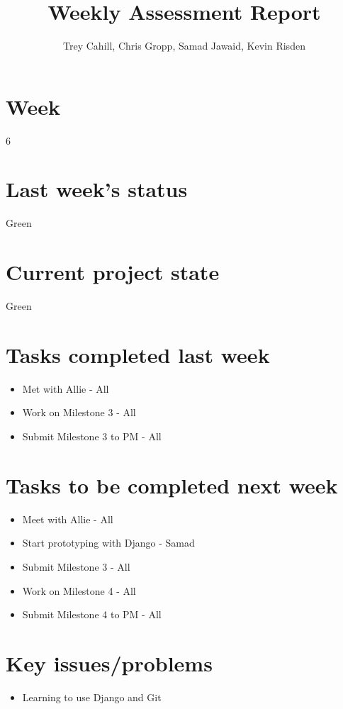 \documentclass{article}
\title{Weekly Assessment Report}
\author{Trey Cahill, Chris Gropp, Samad Jawaid, Kevin Risden}
\begin{document}
\maketitle
\section{Week}
6
\section{Last week's status}
Green
\section{Current project state}
Green
\section{Tasks completed last week}
\begin{itemize}
\item Met with Allie - All
\item Work on Milestone 3 - All
\item Submit Milestone 3 to PM - All
\end{itemize}
\section{Tasks to be completed next week}
\begin{itemize}
\item Meet with Allie - All
\item Start prototyping with Django - Samad
\item Submit Milestone 3 - All
\item Work on Milestone 4 - All
\item Submit Milestone 4 to PM - All
\end{itemize}
\section{Key issues/problems}
\begin{itemize}
\item Learning to use Django and Git
\end{itemize}
\end{document}

